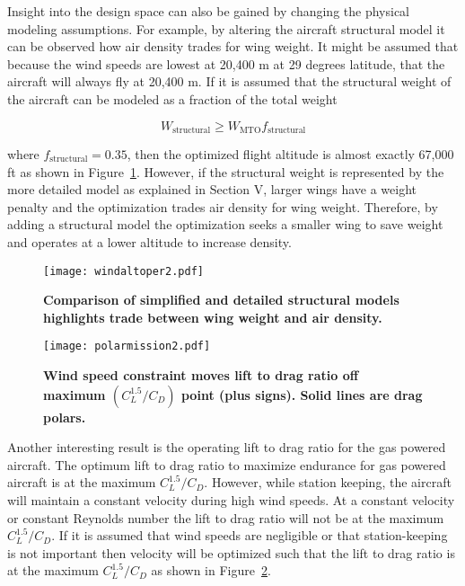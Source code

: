 Insight into the design space can also be gained by changing the physical modeling assumptions.
For example, by altering the aircraft structural model it can be observed how air density trades for wing weight. 
It might be assumed that because the wind speeds are lowest at 20,400 m at 29 degrees latitude, that the aircraft will always fly at 20,400 m.  
If it is assumed that the structural weight of the aircraft can be modeled as a fraction of the total weight 

\begin{equation}
    W_{\text{structural}} \geq W_{\text{MTO}} f_{\text{structural}}
\end{equation}

where $f_{\text{structural}} = 0.35$, then the optimized flight altitude is almost exactly 67,000 ft as shown in Figure~\ref{f:altoper}.  
However, if the structural weight is represented by the more detailed model as explained in Section V, larger wings have a weight penalty and the optimization trades air density for wing weight.
Therefore, by adding a structural model the optimization seeks a smaller wing to save weight and operates at a lower altitude to increase density. 

\begin{figure}[h!]
	\begin{center}
	\texttt{[image: windaltoper2.pdf]}
 \caption{\textbf{Comparison of simplified and detailed structural models highlights trade between wing weight and air density.}}
 \label{f:altoper}
	\end{center}
\end{figure}

\begin{figure}[h!]
	\begin{center}
	\texttt{[image: polarmission2.pdf]}
    \caption{\textbf{Wind speed constraint moves lift to drag ratio off maximum $(C_L^{1.5}/C_D)$ point (plus signs). Solid lines are drag polars.}}
 \label{f:polarmission}
	\end{center}
\end{figure}

Another interesting result is the operating lift to drag ratio for the gas powered aircraft.  
The optimum lift to drag ratio to maximize endurance for gas powered aircraft is at the maximum $C_L^{1.5}/C_D$.\cite{br2}  
However, while station keeping, the aircraft will maintain a constant velocity during high wind speeds.  
At a constant velocity or constant Reynolds number the lift to drag ratio will not be at the maximum $C_L^{1.5}/C_D$.  
If it is assumed that wind speeds are negligible or that station-keeping is not important then velocity will be optimized such that the lift to drag ratio is at the maximum $C_L^{1.5}/C_D$ as shown in Figure~\ref{f:polarmission}.


